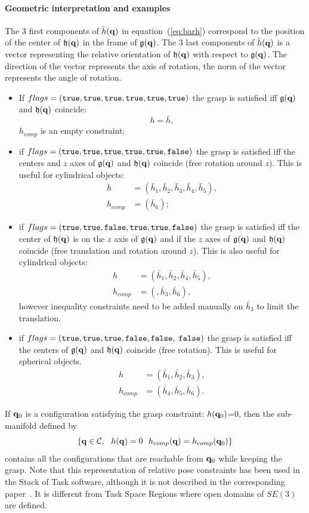 \paragraph{Geometric interpretation and examples}
The 3 first components of $\bar{h}(\mathbf{q})$ in equation~(\ref{eq:barh}) correspond to the position of the center of $\mathfrak{h}(\mathbf{q})$ in the frame of $\mathfrak{g}(\mathbf{q})$. The 3 last components of $\bar{h}(\mathbf{q})$ is a vector representing the relative orientation of $\mathfrak{h}(\mathbf{q})$ with respect to $\mathfrak{g}(\mathbf{q})$. The direction of the vector represents the axis of rotation, the norm of the vector represents the angle of rotation.
\begin{itemize}
\item If $flags=(\texttt{true},\texttt{true},\texttt{true},\texttt{true},\texttt{true},\texttt{true})$ the grasp is satisfied iff $\mathfrak{g}(\mathbf{q})$ and $\mathfrak{h}(\mathbf{q})$ coincide:
  $$ h =\bar{h},$$
  $h_{comp}$ is an empty constraint;
\item if $flags=(\texttt{true},\texttt{true},\texttt{true},\texttt{true},\texttt{true},\texttt{false})$ the grasp is satisfied iff the centers and $z$ axes of $\mathfrak{g}(\mathbf{q})$ and $\mathfrak{h}(\mathbf{q})$ coincide (free rotation around $z$). This is useful for cylindrical objects:
  \begin{align*}
    h &= (\bar{h}_1,\bar{h}_2,\bar{h}_3,\bar{h}_4,\bar{h}_5),\\
    h_{comp} &= (\bar{h}_6);
  \end{align*}
\item {\color{blue}if $flags=(\texttt{true},\texttt{true},\texttt{false},\texttt{true},\texttt{true},\texttt{false})$
  the grasp is satisfied iff the center of $\mathfrak{h}(\mathbf{q})$ is on the
  $z$ axis of $\mathfrak{g}(\mathbf{q})$ and if the $z$ axes of
  $\mathfrak{g}(\mathbf{q})$ and $\mathfrak{h}(\mathbf{q})$ coincide (free translation
  and rotation around $z$). This is also useful for cylindrical
  objects:
  \begin{align*}
    h &= (\bar{h}_1,\bar{h}_2,\bar{h}_4,\bar{h}_5),\\
    h_{comp} &= (,\bar{h}_3,\bar{h}_6),
  \end{align*}
  however inequality constraints need to be added manually on $\bar{h}_3$ to
  limit the translation.
  }
\item if $flags=(\texttt{true},\texttt{true},\texttt{true},\texttt{false},\texttt{false},$ $\texttt{false})$ the grasp is satisfied iff the centers of $\mathfrak{g}(\mathbf{q})$ and $\mathfrak{h}(\mathbf{q})$ coincide (free rotation). This is useful for spherical objects.
  \begin{align*}
    h &= (\bar{h}_1,\bar{h}_2,\bar{h}_3),\\
    h_{comp} &= (\bar{h}_4,\bar{h}_5,\bar{h}_6).
  \end{align*}
\end{itemize}
If $\mathbf{q}_0$ is a configuration satisfying the grasp constraint: $h(\mathbf{q}_0)$=0, then the sub-manifold defined by
$$
\left\{\conf\in\CS,\ \ h(\conf)=0\ \ h_{comp}(\conf) =  h_{comp}(\conf_0)\right\}
$$
contains all the configurations that are reachable from $\mathbf{q}_0$ while keeping the grasp. Note that this representation of relative pose constraints has been used in the Stack of Task software, although it is not described in the corresponding paper~\cite{SoT}. It is different from Task Space Regions \cite{berenson2011} where open domains of $SE(3)$ are defined.

